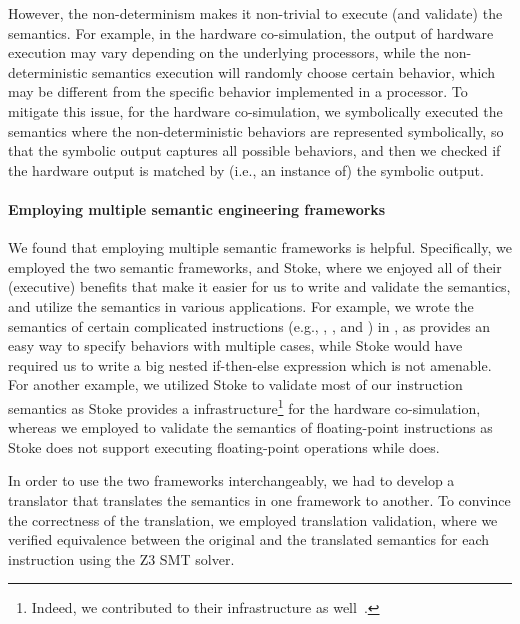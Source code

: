 {However, the non-determinism makes it non-trivial to execute (and validate) the semantics.
For example, in the hardware co-simulation, the output of hardware execution may vary depending on the underlying processors, while the non-deterministic semantics execution will randomly choose certain behavior, which may be different from the specific behavior implemented in a processor.
To mitigate this issue, for the hardware co-simulation, we symbolically executed the semantics where the non-deterministic behaviors are represented symbolically, so that the symbolic output captures all possible behaviors, and then we checked if the hardware output is matched by (i.e., an instance of) the symbolic output.

\paragraph{Employing multiple semantic engineering frameworks}

We found that employing multiple semantic frameworks is helpful. Specifically, we employed the two semantic frameworks, \K and Stoke, where we enjoyed all of their (executive) benefits that make it easier for us to write and validate the semantics, and utilize the semantics in various applications. For example, we wrote the semantics of certain complicated instructions (e.g., , , and ) in \K, as \K provides an easy way to specify behaviors with multiple cases, while Stoke would have required us to write a big nested if-then-else expression which is not amenable. For another example, we utilized Stoke to validate most of our instruction semantics as Stoke provides a infrastructure\footnote{Indeed, we contributed to their infrastructure as well~\cite{improving-stoke}.} for the hardware co-simulation, whereas we employed \K to validate the semantics of floating-point instructions as Stoke does not support executing floating-point operations while \K does.

In order to use the two frameworks interchangeably, we had to develop a translator that translates the semantics in one framework to another. To convince the correctness of the translation, we employed translation validation, where we verified equivalence between the original and the translated semantics for each instruction using the Z3 SMT solver.

}